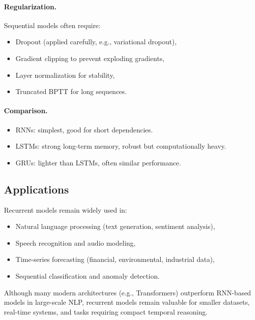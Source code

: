 \documentclass[12pt,a4paper]{report}
\begin{document}
\paragraph{Regularization.}
Sequential models often require:
\begin{itemize}
    \item Dropout (applied carefully, e.g., variational dropout),
    \item Gradient clipping to prevent exploding gradients,
    \item Layer normalization for stability,
    \item Truncated BPTT for long sequences.
\end{itemize}

\paragraph{Comparison.}
\begin{itemize}
    \item RNNs: simplest, good for short dependencies.
    \item LSTMs: strong long-term memory, robust but computationally heavy.
    \item GRUs: lighter than LSTMs, often similar performance.
\end{itemize}

\vspace{1em}
\subsection{Applications}

Recurrent models remain widely used in:
\begin{itemize}
    \item Natural language processing (text generation, sentiment analysis),
    \item Speech recognition and audio modeling,
    \item Time-series forecasting (financial, environmental, industrial data),
    \item Sequential classification and anomaly detection.
\end{itemize}

Although many modern architectures (e.g., Transformers) outperform RNN-based models in large-scale NLP, recurrent models remain valuable for smaller datasets, real-time systems, and tasks requiring compact temporal reasoning.

\vspace{1em}
\end{document}
